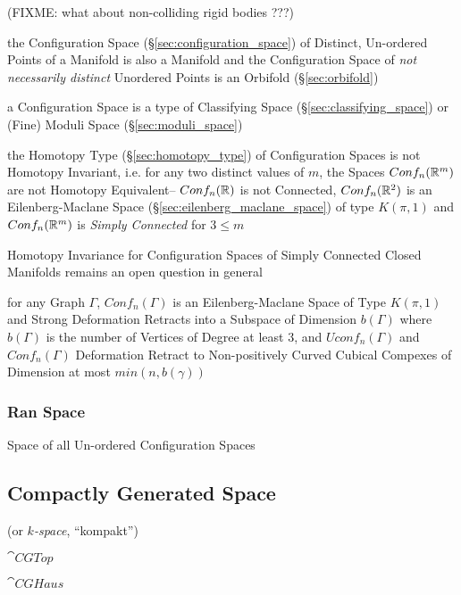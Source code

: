 (FIXME: what about non-colliding rigid bodies ???)

the Configuration Space (\S\ref{sec:configuration_space}) of Distinct,
Un-ordered Points of a Manifold is also a Manifold and the Configuration Space
of \emph{not necessarily distinct} Unordered Points is an Orbifold
(\S\ref{sec:orbifold})

a Configuration Space is a type of Classifying Space
(\S\ref{sec:classifying_space}) or (Fine) Moduli Space
(\S\ref{sec:moduli_space})

the Homotopy Type (\S\ref{sec:homotopy_type}) of Configuration Spaces is not
Homotopy Invariant, i.e. for any two distinct values of $m$, the Spaces
$Conf_n(\mathbb{R}^m)$ are not Homotopy Equivalent-- $Conf_n(\mathbb{R})$ is not
Connected, $Conf_n(\mathbb{R}^2)$ is an Eilenberg-Maclane Space
(\S\ref{sec:eilenberg_maclane_space}) of type $K(\pi,1)$ and $Conf_n(\mathbb{R}^m)$
is \emph{Simply Connected} for $3 \leq m$

Homotopy Invariance for Configuration Spaces of Simply Connected Closed
Manifolds remains an open question in general

for any Graph $\Gamma$, $Conf_n(\Gamma)$ is an Eilenberg-Maclane Space of Type
$K(\pi,1)$ and Strong Deformation Retracts into a Subspace of Dimension
$b(\Gamma)$ where $b(\Gamma)$ is the number of Vertices of Degree at least 3,
and $Uconf_n(\Gamma)$ and $Conf_n(\Gamma)$ Deformation Retract to
Non-positively Curved Cubical Compexes of Dimension at most $min(n,b(\gamma))$



\subsubsection{Ran Space}\label{sec:ran_space}

Space of all Un-ordered Configuration Spaces



\subsection{Compactly Generated Space}\label{sec:compactly_generated}

(or \emph{$k$-space}, ``kompakt'')

$\cat{CGTop}$

$\cat{CGHaus}$



